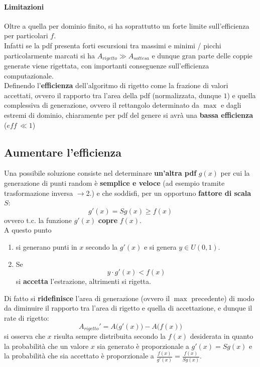 \documentclass[10pt, oneside]{book}
\newcommand{\rarr}{$\rightarrow$}
\begin{document}
\paragraph{Limitazioni} Oltre a quella per dominio finito, si ha soprattutto un forte limite sull'efficienza per particolari $f$.\\
Infatti se la pdf presenta forti escursioni tra massimi e minimi / picchi particolarmente marcati si ha $\displaystyle A_{rigetto} \gg A_{sottesa}$ e dunque gran parte delle coppie generate viene rigettata, con importanti conseguenze sull'efficienza computazionale.\\
Definendo l'\textbf{efficienza} dell'algoritmo di rigetto come la frazione di valori accettati, ovvero il rapporto tra l'area della pdf (normalizzata, dunque $1$) e quella complessiva di generazione, ovvero il rettangolo determinato da $\max$ e dagli estremi di dominio, chiaramente per pdf del genere si avrà una \textbf{bassa efficienza} ($eff \, \ll 1$)

\subsection{Aumentare l'efficienza}
Una possibile soluzione consiste nel determinare \textbf{un'altra pdf} $g(x)$ per cui la generazione di punti random è \textbf{semplice e veloce} (ad esempio tramite trasformazione inversa \rarr 2.) e che soddisfi, per un opportuno \textbf{fattore di scala $S$}:
\[g'(x) = Sg(x) \geq f(x)\]
ovvero t.c. la funzione $g'(x)$ \textbf{copre} $f(x)$.\\
A questo punto 
\begin{enumerate}
\item si generano punti in $x$ secondo la $g'(x)$ e si genera $y \in U(0,1)$.
\item Se 
\[y \cdot g'(x) < f(x)\]
si \textbf{accetta} l'estrazione, altrimenti si rigetta.
\end{enumerate}
Di fatto si \textbf{ridefinisce} l'area di generazione (ovvero il $\max$ precedente) di modo da diminuire il rapporto tra l'area di rigetto e quella di accettazione, e dunque il rate di rigetto:
\[A_{rigetto}' = A\big( g'(x) \big) - A \big(f(x)\big)\]
si osserva che $x$ risulta sempre distribuita secondo la $f(x)$ desiderata in quanto la probabilità che un valore $x$ sia generato è proporzionale a $g'(x) = S g(x)$ e la probabilità che sia accettato è proporzionale a $\displaystyle \frac{f(x)}{g'(x)} = \frac{f(x)}{S g(x)}$.
\end{document}
